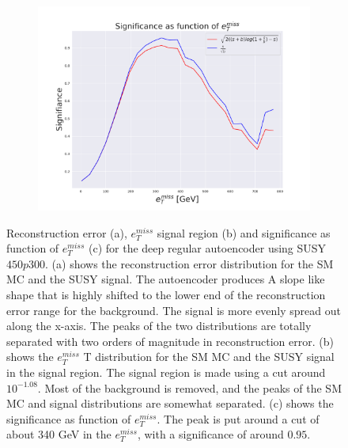 \begin{figure}[H]
\begin{subfigure}{.40\textwidth}
        \caption{}
        \label{fig:AE_2lep_big_etmiss_450_2}
    \end{subfigure}
    \hfill 
    \begin{subfigure}{.40\textwidth}
        \includegraphics[width=\textwidth]{Figures/AE_testing/big/2lep/significance_etmiss_450p0p0300_-1.0770415453595523.pdf}
        \caption{}
        \label{fig:AE_2lep_big_signi_450_2}
    \end{subfigure}
    \hfill      
    \caption[2lep deep network | $450p300$ | AE | 2]{Reconstruction error (a), $e_T^{miss}$ signal region (b) and significance as function of 
    $e_T^{miss}$ (c) for the deep regular autoencoder using SUSY $450p300$. 
    (a) shows the reconstruction error distribution for the SM MC and the SUSY signal. 
    The autoencoder produces A slope like shape that is highly shifted to the lower end of the reconstruction error range
for the background. The signal is more evenly spread out along the x-axis. The peaks of the two distributions are totally separated
with two orders of magnitude in reconstruction error. (b) shows the $e_T^{miss}$
T distribution for the SM MC and the SUSY signal in the signal region. The signal region is made using a cut around
$10^{-1.08}$. Most of the background is removed, and the peaks of the SM MC and signal distributions are
somewhat separated. (c) shows the significance as function of $e_T^{miss}$. The peak is put 
around a cut of about 340 GeV in the $e_T^{miss}$, with a significance of around $0.95$.}
    \label{fig:AE_2lep_big_rec_sig_signi_450_2}
\end{figure}

